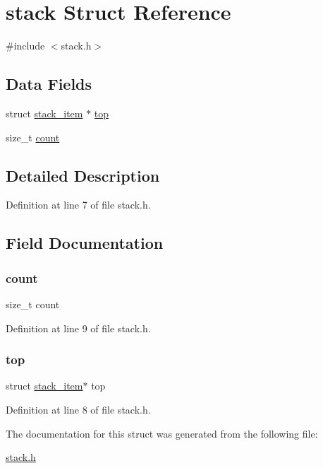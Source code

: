 \hypertarget{structstack}{}\section{stack Struct Reference}
\label{structstack}


{\ttfamily \#include $<$stack.\+h$>$}

\subsection*{Data Fields}
\begin{DoxyCompactItemize}
\item 
struct \mbox{\hyperlink{structstack__item}{stack\+\_\+item}} $\ast$ \mbox{\hyperlink{structstack_abbdb42d3275da0ecf50fcd23a99c7e5b}{top}}
\item 
size\+\_\+t \mbox{\hyperlink{structstack_a76d971a3c552bc58ba9f0d5fceae9806}{count}}
\end{DoxyCompactItemize}


\subsection{Detailed Description}


Definition at line 7 of file stack.\+h.



\subsection{Field Documentation}
\mbox{\label{structstack_a76d971a3c552bc58ba9f0d5fceae9806}} 
\subsubsection{\texorpdfstring{count}{count}}
{\footnotesize\ttfamily size\+\_\+t count}



Definition at line 9 of file stack.\+h.

\mbox{\label{structstack_abbdb42d3275da0ecf50fcd23a99c7e5b}} 
\subsubsection{\texorpdfstring{top}{top}}
{\footnotesize\ttfamily struct \mbox{\hyperlink{structstack__item}{stack\+\_\+item}}$\ast$ top}



Definition at line 8 of file stack.\+h.



The documentation for this struct was generated from the following file\+:\begin{DoxyCompactItemize}
\item 
\mbox{\hyperlink{stack_8h}{stack.\+h}}\end{DoxyCompactItemize}
